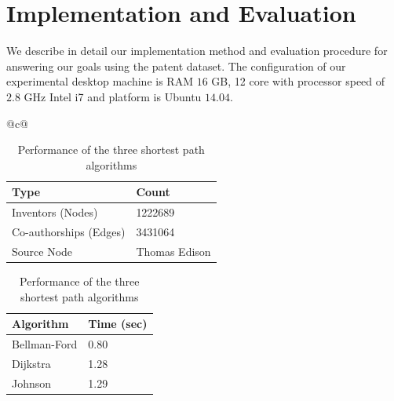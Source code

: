 \section{Implementation and Evaluation}
\label{sec:eval}
We describe in detail our implementation method and evaluation procedure for answering 
our goals using the patent dataset. The configuration of our experimental desktop machine is RAM $16$ GB, 12 core with processor speed of
 $2.8$ GHz Intel i7 and platform is Ubuntu $14.04$.



\begin{table}[h] 
	\scriptsize
  \begin{tabular}{@{}c@{}} 
  \begin{minipage}{0.4\linewidth}
		\begin{center}
	  		\begin{tabular}{| l | l |}
				\hline
				
				{Type} & {Count} \\
				\hline
				\hline
				Inventors (Nodes) & 1222689 \\
				Co-authorships (Edges) & 3431064 \\
				Source Node & Thomas Edison\\
				\hline
			\end{tabular}		
			\caption {\scriptsize Details of the co-authorship graph}
			\label{tab:model}

			\vspace{0.85cm}

			\begin{tabular}{| l | l |}
				\hline
				{Algorithm} & {Time (sec)} \\
				\hline
				\hline
				Bellman-Ford & 0.80 \\
				Dijkstra & 1.28 \\
				Johnson & 1.29 \\
				\hline
			\end{tabular}
			\caption {\scriptsize Performance of the three shortest path algorithms}
			\label{tab:algos}
		\end{center}


\end{minipage}
\end{tabular}
\end{table}
